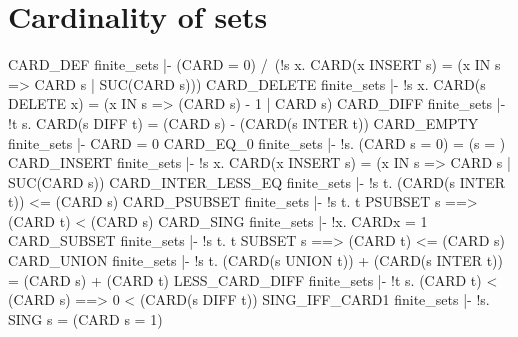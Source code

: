 \section{Cardinality of sets}
\THEOREM CARD\_DEF finite\_sets
|- (CARD{} = 0) /\
   (!s x. CARD(x INSERT s) = (x IN s => CARD s | SUC(CARD s)))
\ENDTHEOREM
\THEOREM CARD\_DELETE finite\_sets
|- !s x. CARD(s DELETE x) = (x IN s => (CARD s) - 1 | CARD s)
\ENDTHEOREM
\THEOREM CARD\_DIFF finite\_sets
|- !t s. CARD(s DIFF t) = (CARD s) - (CARD(s INTER t))
\ENDTHEOREM
\THEOREM CARD\_EMPTY finite\_sets
|- CARD{} = 0
\ENDTHEOREM
\THEOREM CARD\_EQ\_0 finite\_sets
|- !s. (CARD s = 0) = (s = {})
\ENDTHEOREM
\THEOREM CARD\_INSERT finite\_sets
|- !s x. CARD(x INSERT s) = (x IN s => CARD s | SUC(CARD s))
\ENDTHEOREM
\THEOREM CARD\_INTER\_LESS\_EQ finite\_sets
|- !s t. (CARD(s INTER t)) <= (CARD s)
\ENDTHEOREM
\THEOREM CARD\_PSUBSET finite\_sets
|- !s t. t PSUBSET s ==> (CARD t) < (CARD s)
\ENDTHEOREM
\THEOREM CARD\_SING finite\_sets
|- !x. CARD{x} = 1
\ENDTHEOREM
\THEOREM CARD\_SUBSET finite\_sets
|- !s t. t SUBSET s ==> (CARD t) <= (CARD s)
\ENDTHEOREM
\THEOREM CARD\_UNION finite\_sets
|- !s t. (CARD(s UNION t)) + (CARD(s INTER t)) = (CARD s) + (CARD t)
\ENDTHEOREM
\THEOREM LESS\_CARD\_DIFF finite\_sets
|- !t s. (CARD t) < (CARD s) ==> 0 < (CARD(s DIFF t))
\ENDTHEOREM
\THEOREM SING\_IFF\_CARD1 finite\_sets
|- !s. SING s = (CARD s = 1)
\ENDTHEOREM

